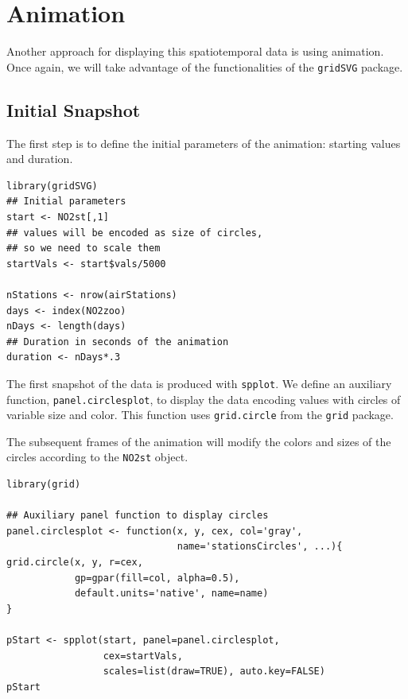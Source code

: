 \documentclass[smallroyalvopaper]{memoir}
\begin{document}
\section{\floweroneleft Animation}
\label{sec-4}
Another approach for displaying this spatiotemporal data is using
animation. Once again, we will take advantage of the functionalities
of the \texttt{gridSVG} package.

\subsection{Initial Snapshot}
\label{sec-4-1}
The first step is to define the initial parameters of the animation:
starting values and duration.


\lstset{language=R,numbers=none}
\begin{lstlisting}
library(gridSVG)
## Initial parameters
start <- NO2st[,1]
## values will be encoded as size of circles,
## so we need to scale them
startVals <- start$vals/5000

nStations <- nrow(airStations)
days <- index(NO2zoo)
nDays <- length(days)
## Duration in seconds of the animation
duration <- nDays*.3
\end{lstlisting}

The first snapshot of the data is produced with \texttt{spplot}. We define an
auxiliary function, \texttt{panel.circlesplot}, to display the data encoding
values with circles of variable size and color.  This function
uses \texttt{grid.circle} from the \texttt{grid} package.  

The subsequent frames of the animation will modify the colors and
sizes of the circles according to the \texttt{NO2st} object.


\lstset{language=R,numbers=none}
\begin{lstlisting}
library(grid)

## Auxiliary panel function to display circles
panel.circlesplot <- function(x, y, cex, col='gray',
                              name='stationsCircles', ...){
grid.circle(x, y, r=cex,
            gp=gpar(fill=col, alpha=0.5),
            default.units='native', name=name)
}

pStart <- spplot(start, panel=panel.circlesplot,
                 cex=startVals,
                 scales=list(draw=TRUE), auto.key=FALSE)
pStart
\end{lstlisting}
\end{document}
